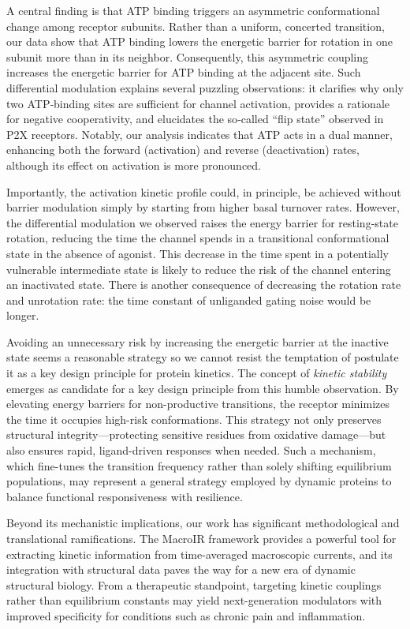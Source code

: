 \documentclass[pdflatex,sn-nature]{sn-jnl}%
\theoremstyle{thmstyleone}%
\theoremstyle{thmstyletwo}%
\theoremstyle{thmstylethree}%
\begin{document}
A central finding is that ATP binding triggers an asymmetric conformational change among receptor subunits. Rather than a uniform, concerted transition, our data show that ATP binding lowers the energetic barrier for rotation in one subunit more than in its neighbor. Consequently, this asymmetric coupling increases the energetic barrier for ATP binding at the adjacent site. Such differential modulation explains several puzzling observations: it clarifies why only two ATP‐binding sites are sufficient for channel activation, provides a rationale for negative cooperativity, and elucidates the so‐called “flip state” observed in P2X receptors. Notably, our analysis indicates that ATP acts in a dual manner, enhancing both the forward (activation) and reverse (deactivation) rates, although its effect on activation is more pronounced.

Importantly, the activation kinetic profile could, in principle, be achieved without barrier modulation simply by starting from higher basal turnover rates. However, the differential modulation we observed raises the energy barrier for resting-state rotation, reducing the time the channel spends in a transitional conformational state in the absence of agonist. This decrease in the time spent in a potentially vulnerable intermediate state is likely to reduce the risk of the channel entering an inactivated state. There is another consequence of  decreasing the rotation rate and unrotation rate: the time constant of unliganded gating noise would be longer. 

Avoiding an unnecessary risk by increasing the energetic barrier at the inactive state seems a reasonable strategy so we cannot resist the temptation of postulate it as a key design principle for protein kinetics. The concept of \textit{kinetic stability} emerges as candidate for a key design principle from this humble observation. By elevating energy barriers for non-productive transitions, the receptor minimizes the time it occupies high-risk conformations. This strategy not only preserves structural integrity—protecting sensitive residues from oxidative damage—but also ensures rapid, ligand-driven responses when needed. Such a mechanism, which fine-tunes the transition frequency rather than solely shifting equilibrium populations, may represent a general strategy employed by dynamic proteins to balance functional responsiveness with resilience. 

Beyond its mechanistic implications, our work has significant methodological and translational ramifications. The MacroIR framework provides a powerful tool for extracting kinetic information from time-averaged macroscopic currents, and its integration with structural data paves the way for a new era of dynamic structural biology. From a therapeutic standpoint, targeting kinetic couplings rather than equilibrium constants may yield next-generation modulators with improved specificity for conditions such as chronic pain and inflammation.
\end{document}
